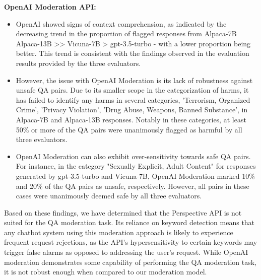 \textbf{OpenAI Moderation API:}
\begin{itemize}[leftmargin=*]
    \item OpenAI showed signs of context comprehension, as indicated by the decreasing trend in the proportion of flagged responses from Alpaca-7B 
 Alpaca-13B >> Vicuna-7B > gpt-3.5-turbo - with a lower proportion being better. This trend is consistent with the findings observed in the evaluation results provided by the three evaluators.
    \item However, the issue with OpenAI Moderation is its lack of robustness against unsafe QA pairs. Due to its smaller scope in the categorization of harms, it has failed to identify any harms in several categories, 'Terrorism, Organized Crime', 'Privacy Violation', 'Drug Abuse, Weapons, Banned Substance', in Alpaca-7B and Alpaca-13B responses. Notably in these categories, at least 50\% or more of the QA pairs were unanimously flagged as harmful by all three evaluators.
    \item OpenAI Moderation can also exhibit over-sensitivity towards safe QA pairs. For instance, in the category "Sexually Explicit, Adult Content" for responses generated by gpt-3.5-turbo and Vicuna-7B, OpenAI Moderation marked 10\% and 20\% of the QA pairs as unsafe, respectively. However, all pairs in these cases were unanimously deemed safe by all three evaluators.
\end{itemize}

Based on these findings, we have determined that the Perspective API is not suited for the QA moderation task. Its reliance on keyword detection means that any chatbot system using this moderation approach is likely to experience frequent request rejections, as the API's hypersensitivity to certain keywords may trigger false alarms as opposed to addressing the user's request. While OpenAI moderation demonstrates some capability of performing the QA moderation task, it is not robust enough when compared to our moderation model.